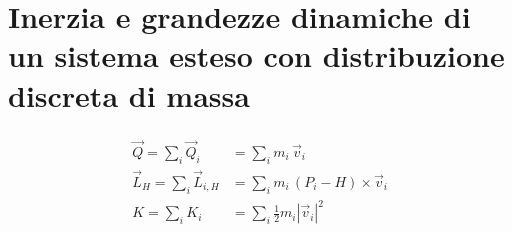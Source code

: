 \documentclass[letterpaper,10pt,italian]{jupyterBook}
\begin{document}
\section{Inerzia e grandezze dinamiche di un sistema esteso con distribuzione discreta di massa}
\label{\detokenize{ch/mechanics/inertia-points:inerzia-e-grandezze-dinamiche-di-un-sistema-esteso-con-distribuzione-discreta-di-massa}}\label{\detokenize{ch/mechanics/inertia-points::doc}}\begin{equation*}
\begin{split}\begin{aligned}
  \vec{Q}       = \sum_i \vec{Q}_i     & = \sum_i  m_i \, \vec{v}_i \\
  \vec{L}_{H}   = \sum_i \vec{L}_{i,H} & = \sum_i  m_i \, (P_i - H) \times \vec{v}_i \\
   K            = \sum_i  K_i          & = \sum_i  \frac{1}{2} m_i \left| \vec{v}_i \right|^2
\end{aligned}\end{split}
\end{equation*}
\end{document}
